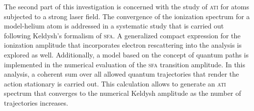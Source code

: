 The second part of this investigation is concerned with the study of
\textsc{ati} for atoms subjected to a strong laser field. The
convergence of the ionization spectrum for a model-helium atom is
addressed in a systematic study that is carried out following
Keldysh's formalism of \textsc{sfa}. A generalized compact expression
for the ionization amplitude that incorporates electron rescattering
into the analysis is explored as well. Additionally, a model based on
the concept of quantum paths is implemented in the numerical
evaluation of the \textsc{sfa} transition amplitude. In this analysis,
a coherent sum over all allowed quantum trajectories that render the
action stationary is carried out. This calculation allows to generate
an \textsc{ati} spectrum that converges to the numerical Keldysh
amplitude as the number of trajectories increases.
































































